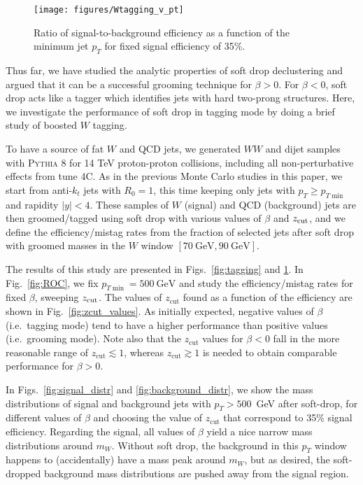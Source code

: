 \documentclass[letterpaper,11pt]{article}
\newcommand{\zcut}{z_\text{cut}}
\DeclareRobustCommand{\Fig}[1]{Fig.~\ref{#1}}
\DeclareRobustCommand{\Figs}[2]{Figs.~\ref{#1} and \ref{#2}}
\newcommand{\pythia}[1]{\textsc{Pythia\xspace #1}}
\begin{document}
\begin{figure}[]
\begin{center}
\texttt{[image: figures/Wtagging\_v\_pt]}
\end{center}
\caption{Ratio of signal-to-background efficiency as a function of the minimum jet $p_{T}$ for fixed signal efficiency of 35\%.
}
\label{fig:efficiencies_vs_pt}
\end{figure}
Thus far, we have studied the analytic properties of soft drop declustering and argued that it can be a successful grooming technique for $\beta >0$.  For $\beta<0$, soft drop acts like a tagger which identifies jets with hard two-prong structures. Here, we investigate the performance of soft drop in tagging mode by doing a brief study of boosted $W$ tagging.

To have a source of fat $W$ and QCD jets, we generated $WW$ and dijet samples with \pythia{8} for 14 TeV proton-proton collisions, including all non-perturbative effects from tune 4C.  As in the previous Monte Carlo studies in this paper, we start from anti-$k_t$ jets with $R_0=1$, this time keeping only jets with $p_T\ge p_{T \min}$ and rapidity $|y|<4$.  These samples of $W$ (signal) and QCD (background) jets are then
groomed/tagged using soft drop with various values of $\beta$ and $z_{\rm cut}$, and we define the efficiency/mistag rates from the fraction of selected jets after soft drop with groomed masses in the $W$ window $[70~\text{GeV}, 90~\text{GeV}]$.

The results of this study are presented in \Figs{fig:tagging}{fig:efficiencies_vs_pt}.  In \Fig{fig:ROC}, we fix $p_{T \min} = 500~\text{GeV}$ and study the efficiency/mistag rates for fixed $\beta$, sweeping $z_{\rm cut}$.  The values of $\zcut$ found as a function of the efficiency are shown in \Fig{fig:zcut_values}.  As initially expected, negative values of $\beta$ (i.e.~tagging mode) tend to have a higher performance than positive values (i.e.~grooming mode).  Note also that the $\zcut$ values for $\beta < 0$ fall in the more reasonable range of $\zcut \lesssim 1$, whereas $\zcut \gtrsim 1$ is needed to obtain comparable performance for $\beta > 0$.

In \Figs{fig:signal_distr}{fig:background_distr}, we show the mass distributions of signal and background jets with $p_T>500$~GeV after soft-drop, for different values of $\beta$ and choosing the value of $\zcut$ that correspond to 35\% signal efficiency. Regarding the signal, all values of $\beta$ yield a nice narrow mass distributions around $m_W$.  Without soft drop, the background in this $p_T$ window happens to (accidentally) have a mass peak around $m_W$, but as desired, the soft-dropped background mass distributions are pushed away from the signal region.
\end{document}

